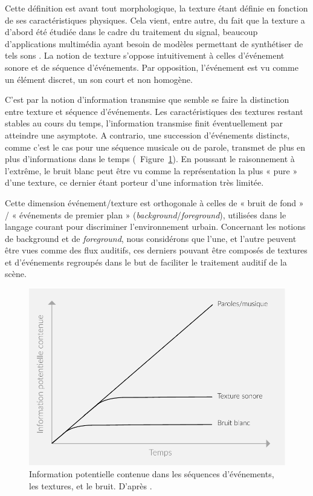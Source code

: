 Cette définition est avant tout morphologique, la texture étant définie en fonction de ses caractéristiques physiques. Cela vient, entre autre, du fait que la texture a d'abord été étudiée dans le cadre du traitement du signal, beaucoup d'applications multimédia ayant besoin de  modèles permettant de synthétiser de tels sons \citep{schwarz2011state}. La notion de texture s'oppose intuitivement à celles d'événement sonore et de séquence d'événements. Par opposition, l'événement est vu comme un élément discret, un son court et non homogène.

C'est par la notion d'information transmise que semble se faire la distinction entre texture et séquence d'événements. Les caractéristiques des textures restant stables au cours du temps, l'information transmise finit éventuellement par atteindre une asymptote. A contrario, une succession d'événements distincts, comme c'est le cas pour une séquence musicale ou de parole, transmet de plus en plus d'informations dans le temps (\cf~Figure~\ref{fig:texture}). En poussant le raisonnement à l’extrême, le bruit blanc peut être vu comme la représentation la plus « pure » d'une texture, ce dernier étant porteur d'une information très limitée.

Cette dimension événement/texture est orthogonale à celles de « bruit de fond » / « événements de premier plan » (\emph{background}/\emph{foreground}), utilisées dans le langage courant pour discriminer l’environnement urbain. Concernant les notions de background et de \emph{foreground}, nous considérons que l'une, et l'autre peuvent être vues comme des flux auditifs, ces derniers pouvant être composés de textures et d’événements regroupés dans le but de faciliter le traitement auditif de la scène.

\begin{figure}[t]
        \myfloatalign
        \includegraphics[width=.8\linewidth]{gfx/ch_3/texture}
        \caption[Information potentielle contenue dans les séquences d'événements, les textures, et le bruit.]{Information potentielle contenue dans les séquences d'événements, les textures, et le bruit. D'après \citep{saint1995classification}.}\label{fig:texture}
\end{figure}

